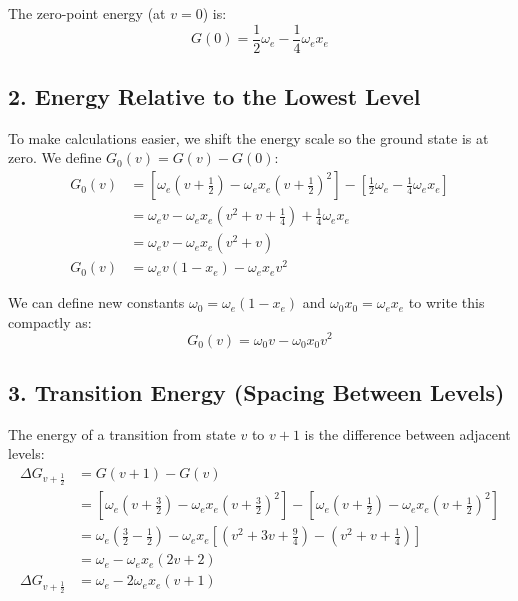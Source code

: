 \documentclass{book}
\begin{document}
The zero-point energy (at $v = 0$) is: %
\begin{equation}
    G(0) = \frac{1}{2}\omega_e - \frac{1}{4}\omega_e x_e
\end{equation}
%

\subsection*{2. Energy Relative to the Lowest Level}
To make calculations easier, we shift the energy scale so the ground state is at zero. We define $G_0(v) = G(v) - G(0)$: %
\begin{align}
    G_0(v) &= \left[ \omega_e \left( v + \frac{1}{2} \right) - \omega_e x_e \left( v + \frac{1}{2} \right)^2 \right] - \left[ \frac{1}{2}\omega_e - \frac{1}{4}\omega_e x_e \right] \nonumber \\
    &= \omega_e v - \omega_e x_e \left( v^2 + v + \frac{1}{4} \right) + \frac{1}{4}\omega_e x_e \nonumber \\
    &= \omega_e v - \omega_e x_e (v^2 + v) \nonumber \\
    G_0(v) &= \omega_e v (1 - x_e) - \omega_e x_e v^2
\end{align}
%

We can define new constants $\omega_0 = \omega_e(1 - x_e)$ and $\omega_0 x_0 = \omega_e x_e$ to write this compactly as: %
\begin{equation}
    G_0(v) = \omega_0 v - \omega_0 x_0 v^2
\end{equation}
%

\subsection*{3. Transition Energy (Spacing Between Levels)}
The energy of a transition from state $v$ to $v+1$ is the difference between adjacent levels: %
\begin{align}
    \Delta G_{v+\frac{1}{2}} &= G(v+1) - G(v) \nonumber \\
    &= \left[ \omega_e \left( v + \frac{3}{2} \right) - \omega_e x_e \left( v + \frac{3}{2} \right)^2 \right] - \left[ \omega_e \left( v + \frac{1}{2} \right) - \omega_e x_e \left( v + \frac{1}{2} \right)^2 \right] \nonumber \\
    &= \omega_e \left( \frac{3}{2} - \frac{1}{2} \right) - \omega_e x_e \left[ \left( v^2 + 3v + \frac{9}{4} \right) - \left( v^2 + v + \frac{1}{4} \right) \right] \nonumber \\
    &= \omega_e - \omega_e x_e (2v + 2) \nonumber \\
    \Delta G_{v+\frac{1}{2}} &= \omega_e - 2\omega_e x_e (v + 1)
\end{align}
%
\end{document}
